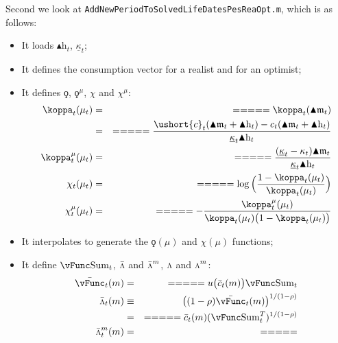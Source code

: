 \documentclass[titlepage,abstract]{\econtex}
\providecommand{\vSum}{\vFunc\text{Sum}}
\providecommand{\Deltah}{\blacktriangle \mathrm{h}}
\providecommand{\Deltam}{\blacktriangle \mathfrak{m}}
\providecommand{\vInv}{\ensuremath{\scriptstyle \Lambda \displaystyle}}
\begin{document}
Second we look at \texttt{AddNewPeriodToSolvedLifeDatesPesReaOpt.m}, which is as follows:
        \begin{itemize}
        \item It loads $\Deltah_{t}$, $\underline{\kappa}_{t}$;
        \item It defines the consumption vector for a realist and for an optimist;
        \item It defines $\ensuremath{\koppa}$, $\ensuremath{\koppa}^{\mu}$, $\chi$ and $\chi^{\mu}$:
            \begin{equation}\begin{gathered}\begin{aligned}
            \koppa_{t} (\mu_{t})      &=& =  =  =  =  =  \koppa_{t} (\Deltam_{t}) \\
                 &=& =  =  =  =  =  \frac{\ushort{c}_{t}(\Deltam_{t} + \Deltah_{t})-c_{t}(\Deltam_{t} + \Deltah _{t})}{\underline{\kappa}_{t} \Deltah_{t}} \\
            \koppa_{t}^{\mu} (\mu_{t})      &=& =  =  =  =  =  \frac{(\underline{\kappa}_{t}-\kappa_{t}) \Deltam_{t}}{\underline{\kappa}_{t} \Deltah_{t}} \\
            \chi_{t} (\mu_{t})      &=& =  =  =  =  =  \log\Big(\frac{1-\koppa_{t} (\mu_{t})}{\koppa_{t} (\mu_{t}) }\Big) \\
            \chi_{t}^{\mu} (\mu_{t})      &=& =  =  =  =  =  -\frac{\koppa_{t}^{\mu}(\mu_{t})}{\koppa_{t} (\mu_{t})\big(1-\koppa_{t} (\mu_{t})\big)}
            \end{aligned}\end{gathered}\end{equation}
        \item It interpolates to generate the $\ensuremath{\koppa}(\mu)$ and $\chi(\mu)$ functions;
        \item It define $\vSum_{t}$, $\bar{\vInv}$ and $\bar{\vInv}^{m}$, $\vInv$ and $\vInv^{m}$:
            \begin{equation}\begin{gathered}\begin{aligned}
            \bar{\vFunc}_{t} (m)      &=& =  =  =  =  =  u\big(\bar{c}_{t}(m)\big) \vSum_{t} \\
            \bar{\vInv}_{t} (m) &\equiv&
            \big((1-\rho)\bar{\vFunc}_{t} (m)\big)^{1/(1-\rho)} \\
                 &=& =  =  =  =  = \bar{c}_{t}(m) (\vSum_{t}^{T})^{1/(1-\rho)} \\
            \bar{\vInv}_{t}^{m} (m)      &=& =  =  =  =  = 

\end{aligned}
\end{gathered}
\end{equation}
\end{itemize}
\end{document}
